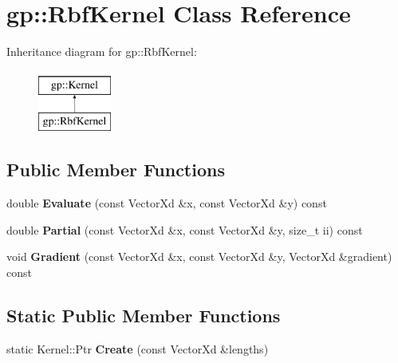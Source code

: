 \hypertarget{classgp_1_1_rbf_kernel}{}\section{gp\+:\+:Rbf\+Kernel Class Reference}
\label{classgp_1_1_rbf_kernel}
Inheritance diagram for gp\+:\+:Rbf\+Kernel\+:\begin{figure}[H]
\begin{center}
\leavevmode
\includegraphics[height=2.000000cm]{classgp_1_1_rbf_kernel}
\end{center}
\end{figure}
\subsection*{Public Member Functions}
\begin{DoxyCompactItemize}
\item 
\hypertarget{classgp_1_1_rbf_kernel_a580c375d8dc6850991b68bdc7a73f426}{}\label{classgp_1_1_rbf_kernel_a580c375d8dc6850991b68bdc7a73f426} 
double {\bfseries Evaluate} (const Vector\+Xd \&x, const Vector\+Xd \&y) const
\item 
\hypertarget{classgp_1_1_rbf_kernel_a6b547d97211b02629ac4b19344c0c3f7}{}\label{classgp_1_1_rbf_kernel_a6b547d97211b02629ac4b19344c0c3f7} 
double {\bfseries Partial} (const Vector\+Xd \&x, const Vector\+Xd \&y, size\+\_\+t ii) const
\item 
\hypertarget{classgp_1_1_rbf_kernel_a54f8f958a7fe109fcd39fb1ea43fa5a0}{}\label{classgp_1_1_rbf_kernel_a54f8f958a7fe109fcd39fb1ea43fa5a0} 
void {\bfseries Gradient} (const Vector\+Xd \&x, const Vector\+Xd \&y, Vector\+Xd \&gradient) const
\end{DoxyCompactItemize}
\subsection*{Static Public Member Functions}
\begin{DoxyCompactItemize}
\item 
\hypertarget{classgp_1_1_rbf_kernel_a9576aa74cfd78fb43d671e748cc7cf49}{}\label{classgp_1_1_rbf_kernel_a9576aa74cfd78fb43d671e748cc7cf49} 
static Kernel\+::\+Ptr {\bfseries Create} (const Vector\+Xd \&lengths)
\end{DoxyCompactItemize}
